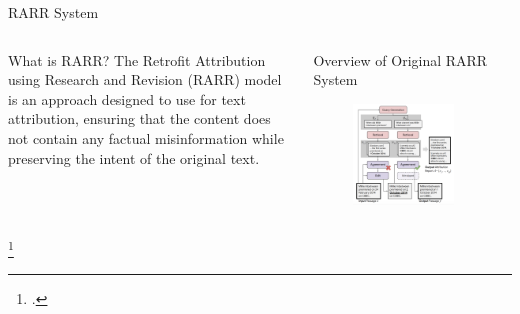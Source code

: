 \documentclass{beamer}
\begin{document}
	\begin{frame}{RARR System}
		\begin{columns}
			\begin{block}{\scriptsize What is RARR?}\scriptsize
				The Retrofit Attribution using Research and Revision (RARR) model is an approach designed to use for text attribution, ensuring that the content does not contain any factual misinformation while preserving the intent of the original text.
			\end{block}
			\begin{block}{\scriptsize Overview of Original RARR System\footnotemark}\scriptsize
				\begin{figure}
					\centering
					\includegraphics[width=0.85\textwidth]{rarr.png}
				\end{figure}
			\end{block}
		\end{columns}\footcitetext{gao2023rarr}
	\end{frame}
	
\end{document}
